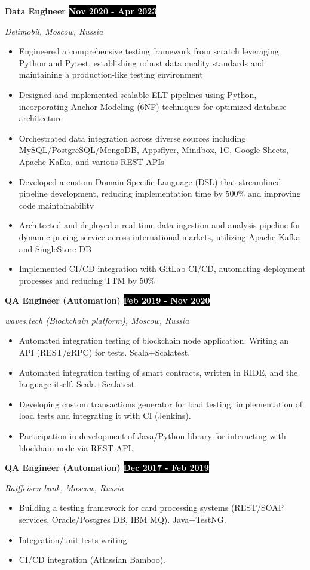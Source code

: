 \documentclass[11pt,a4paper]{article}
\newcommand{\timeperiod}[1]{%
    \hfill{\small\colorbox{black}{\textcolor{white}{\textbf{#1}}}}\par%
}
\newcommand{\jobsep}{\vspace{1.5em}}
\begin{document}
\jobsep
\textbf{Data Engineer}\timeperiod{Nov 2020 - Apr 2023}
\textit{Delimobil, Moscow, Russia}
\begin{itemize}
    \item Engineered a comprehensive testing framework from scratch leveraging Python and Pytest, establishing robust data quality standards and maintaining a production-like testing environment
    \item Designed and implemented scalable ELT pipelines using Python, incorporating Anchor Modeling (6NF) techniques for optimized database architecture
    \item Orchestrated data integration across diverse sources including MySQL/PostgreSQL/MongoDB, Appsflyer, Mindbox, 1C, Google Sheets, Apache Kafka, and various REST APIs
    \item Developed a custom Domain-Specific Language (DSL) that streamlined pipeline development, reducing implementation time by 500\% and improving code maintainability
    \item Architected and deployed a real-time data ingestion and analysis pipeline for dynamic pricing service across international markets, utilizing Apache Kafka and SingleStore DB
    \item Implemented CI/CD integration with GitLab CI/CD, automating deployment processes and reducing TTM by 50\%
\end{itemize}

\jobsep
\textbf{QA Engineer (Automation)}\timeperiod{Feb 2019 - Nov 2020}
\textit{waves.tech (Blockchain platform), Moscow, Russia}
\begin{itemize}
    \item Automated integration testing of blockchain node application. Writing an API (REST/gRPC) for tests. Scala+Scalatest.
    \item Automated integration testing of smart contracts, written in RIDE, and the language itself. Scala+Scalatest.
    \item Developing custom transactions generator for load testing, implementation of load tests and integrating it with CI (Jenkins).
    \item Participation in development of Java/Python library for interacting with blockhain node via REST API.
\end{itemize}

\jobsep
\textbf{QA Engineer (Automation)}\timeperiod{Dec 2017 - Feb 2019}
\textit{Raiffeisen bank, Moscow, Russia}
\begin{itemize}
    \item Building a testing framework for card processing systems (REST/SOAP services, Oracle/Postgres DB, IBM MQ). Java+TestNG.
    \item Integration/unit tests writing.
    \item CI/CD integration (Atlassian Bamboo).
\end{itemize}
\end{document}
